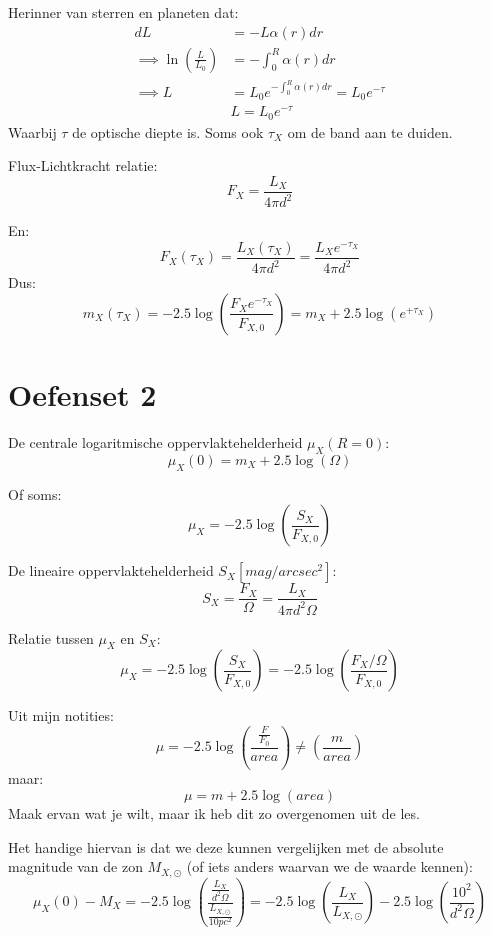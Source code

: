 \documentclass[a4paper,twoside]{article}
\theoremstyle{definition}
\theoremstyle{plain}
\begin{document}
Herinner van sterren en planeten dat:
\begin{align*}
    dL &= -L\alpha(r)dr\\
    \implies \ln \left( \frac{L}{L_0} \right) &= -\int_0^R \alpha(r) dr\\
    \implies L &= L_0 e^{-\int_0^R \alpha(r) dr} = L_0 e^{-\tau}\\
    &\boxed{L = L_0 e^{-\tau}}
\end{align*}
Waarbij $\tau$ de optische diepte is. Soms ook \(\tau_X\) om de band aan te duiden.


Flux-Lichtkracht relatie:
\begin{equation}
    F_X = \frac{L_X}{4 \pi d^2}
\end{equation}

En:
\[
F_X(\tau_X) = \frac{L_X(\tau_X)}{4 \pi d^2} = \frac{L_{X} e^{-\tau_X}}{4 \pi d^2}
\]
Dus:
\[
m_X (\tau_X) = -2.5 \log \left( \frac{F_X  e^{-\tau_X}}{F_{X,0}} \right) = m_X + 2.5 \log \left( e^{+\tau_X} \right)
\]


\section{Oefenset 2}

De centrale logaritmische oppervlaktehelderheid \(\mu_X (R=0)\):
\begin{equation}
    \mu_X (0) = m_X + 2.5 \log \left(\Omega \right)
\end{equation}

Of soms:
\[
\mu_X = -2.5 \log \left(\frac{S_X}{F_{X,0}}\right)
\]

De lineaire oppervlaktehelderheid \(S_X [mag/arcsec^2]\):
\begin{equation}
    S_X = \frac{F_X}{\Omega} = \frac{L_X}{4 \pi d^2 \Omega}
\end{equation}

Relatie tussen \(\mu_X\) en \(S_X\):
\begin{equation}
    \mu_X = -2.5 \log \left( \frac{S_X}{F_{X,0}} \right) = -2.5 \log \left( \frac{F_X/\Omega}{F_{X,0}} \right)
\end{equation}

Uit mijn notities:
\[
\mu = -2.5\log\left(\frac{\frac{F}{F_0}}{area}\right) \neq\left(\frac{m}{area}\right)
\]
maar:
\[
\mu = m + 2.5 \log (area)
\]
Maak ervan wat je wilt, maar ik heb dit zo overgenomen uit de les.

Het handige hiervan is dat we deze kunnen vergelijken met de absolute magnitude van de zon \(M_{X,\odot}\) (of iets anders waarvan we de waarde kennen):
\begin{equation}
    \mu_X (0) - M_X = -2.5 \log \left( \frac{\frac{L_X}{d^2\Omega}}{\frac{L_{X,\odot}}{10pc^2}} \right) = -2.5 \log \left( \frac{L_X}{L_{X,\odot}} \right) - 2.5 \log \left( \frac{10^2}{d^2\Omega} \right)
\end{equation}
\end{document}
